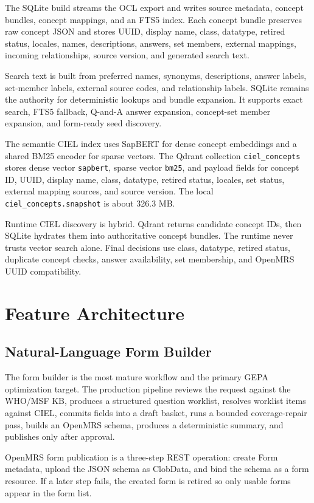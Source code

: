 \documentclass[11pt]{article}
\newcommand{\OpenMRS}{OpenMRS}
\newcommand{\CIEL}{CIEL}
\newcommand{\WHO}{WHO/MSF}
\begin{document}
The SQLite build streams the OCL export and writes source metadata, concept bundles, concept mappings, and an FTS5 index. Each concept bundle preserves raw concept JSON and stores UUID, display name, class, datatype, retired status, locales, names, descriptions, answers, set members, external mappings, incoming relationships, source version, and generated search text.

Search text is built from preferred names, synonyms, descriptions, answer labels, set-member labels, external source codes, and relationship labels. SQLite remains the authority for deterministic lookups and bundle expansion. It supports exact search, FTS5 fallback, Q-and-A answer expansion, concept-set member expansion, and form-ready seed discovery.

The semantic CIEL index uses SapBERT for dense concept embeddings and a shared BM25 encoder for sparse vectors. The Qdrant collection \texttt{ciel\_concepts} stores dense vector \texttt{sapbert}, sparse vector \texttt{bm25}, and payload fields for concept ID, UUID, display name, class, datatype, retired status, locales, set status, external mapping sources, and source version. The local \texttt{ciel\_concepts.snapshot} is about 326.3 MB.

Runtime CIEL discovery is hybrid. Qdrant returns candidate concept IDs, then SQLite hydrates them into authoritative concept bundles. The runtime never trusts vector search alone. Final decisions use class, datatype, retired status, duplicate concept checks, answer availability, set membership, and \OpenMRS{} UUID compatibility.

\section{Feature Architecture}

\subsection{Natural-Language Form Builder}

The form builder is the most mature workflow and the primary GEPA optimization target. The production pipeline reviews the request against the \WHO{} KB, produces a structured question worklist, resolves worklist items against \CIEL{}, commits fields into a draft basket, runs a bounded coverage-repair pass, builds an \OpenMRS{} schema, produces a deterministic summary, and publishes only after approval.

\OpenMRS{} form publication is a three-step REST operation: create Form metadata, upload the JSON schema as ClobData, and bind the schema as a form resource. If a later step fails, the created form is retired so only usable forms appear in the form list.
\end{document}
